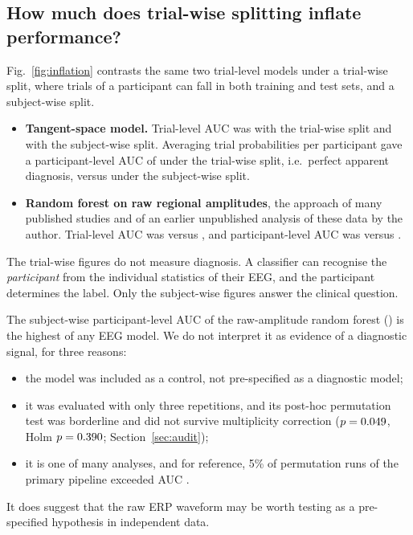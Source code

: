 \subsection{How much does trial-wise splitting inflate performance?}\label{sec:inflation}
Fig.~\ref{fig:inflation} contrasts the same two trial-level models under a trial-wise split, where trials of a
participant can fall in both training and test sets, and a subject-wise split.
\begin{itemize}
  \item \textbf{Tangent-space model.} Trial-level AUC was \InflTsLrTrialSplitTrialAuc{} with the trial-wise split and
        \InflTsLrSubjectSplitTrialAuc{} with the subject-wise split. Averaging trial probabilities per participant
        gave a participant-level AUC of \InflTsLrTrialSplitSubjectAuc{} under the trial-wise split, i.e.\ perfect
        apparent diagnosis, versus \InflTsLrSubjectSplitSubjectAuc{} under the subject-wise split.
  \item \textbf{Random forest on raw regional amplitudes}, the approach of many published studies and of an earlier
        unpublished analysis of these data by the author. Trial-level AUC was
        \InflRawamplitudeRfTrialSplitTrialAuc{} versus \InflRawamplitudeRfSubjectSplitTrialAuc, and participant-level
        AUC was \InflRawamplitudeRfTrialSplitSubjectAuc{} versus \InflRawamplitudeRfSubjectSplitSubjectAuc.
\end{itemize}
The trial-wise figures do not measure diagnosis. A classifier can recognise the \emph{participant} from the
individual statistics of their EEG, and the participant determines the label. Only the subject-wise figures answer
the clinical question.

The subject-wise participant-level AUC of the raw-amplitude random forest (\InflRawamplitudeRfSubjectSplitSubjectAuc)
is the highest of any EEG model. We do not interpret it as evidence of a diagnostic signal, for three reasons:
\begin{itemize}
  \item the model was included as a control, not pre-specified as a diagnostic model;
  \item it was evaluated with only three repetitions, and its post-hoc permutation test was borderline and did not
        survive multiplicity correction ($p=0.049$, Holm $p=0.390$; Section~\ref{sec:audit});
  \item it is one of many analyses, and for reference, 5\% of permutation runs of the primary pipeline exceeded AUC
        \PrimaryLrLAllNullQ.
\end{itemize}
It does suggest that the raw ERP waveform may be worth testing as a pre-specified hypothesis in independent data.

